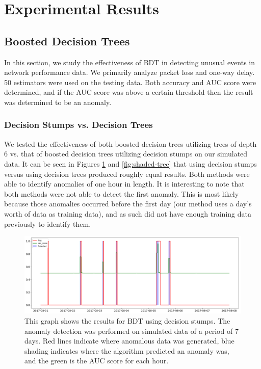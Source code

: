 \documentclass[5p]{elsarticle}
\begin{document}
\section{Experimental Results}

\subsection{Boosted Decision Trees}

In this section, we study the effectiveness of BDT in detecting unusual events in network performance data. We primarily analyze packet loss and one-way delay. 50 estimators were used on the testing data. Both accuracy and AUC score were determined, and if the AUC score was above a certain threshold then the result was determined to be an anomaly.

\subsubsection{Decision Stumps vs. Decision Trees}

We tested the effectiveness of both boosted decision trees utilizing trees of depth 6 vs. that of boosted decision trees utilizing decision stumps on our simulated data. It can be seen in Figures \ref{fig:shaded} and \ref{fig:shaded-tree} that using decision stumps versus using decision trees produced roughly equal results. Both methods were able to identify anomalies of one hour in length. It is interesting to note that both methods were not able to detect the first anomaly. This is most likely because those anomalies occurred before the first day (our method uses a day’s worth of data as training data), and as such did not have enough training data previously to identify them. 

\begin{figure}[htbp]
    \centering
    \includegraphics[width=\linewidth]{shaded-stumps.png}
    \caption{This graph shows the results for BDT using decision stumps. The anomaly detection was performed on simulated data of a period of 7 days. Red lines indicate where anomalous data was generated, blue shading indicates where the algorithm predicted an anomaly was, and the green is the AUC score for each hour.}
    \label{fig:shaded}
\end{figure}
\end{document}
